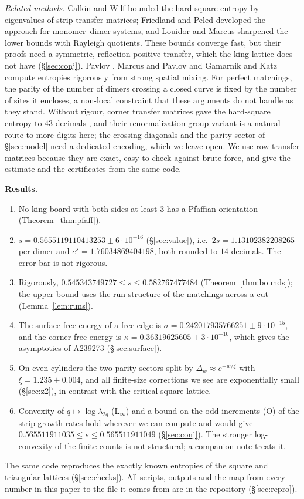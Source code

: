 \documentclass[11pt]{amsart}
\theoremstyle{definition}
\theoremstyle{remark}
\begin{document}
\emph{Related methods.} Calkin and Wilf \cite{calkinwilf1998} bounded the hard-square entropy by
eigenvalues of strip transfer matrices; Friedland and Peled \cite{friedlandpeled2005} developed
the approach for monomer--dimer systems, and Louidor and Marcus \cite{louidormarcus2010}
sharpened the lower bounds with Rayleigh quotients. These bounds converge fast, but their proofs
need a symmetric, reflection-positive transfer, which the king lattice does not have
(\S\ref{sec:conj}). Pavlov \cite{pavlov2012}, Marcus and Pavlov \cite{marcuspavlov2013} and
Gamarnik and Katz \cite{gamarnikkatz2009} compute entropies rigorously from strong spatial
mixing. For perfect matchings, the parity of the number of dimers crossing a closed curve is
fixed by the number of sites it encloses, a non-local constraint that these arguments do not
handle as they stand. Without rigour, corner transfer matrices gave the hard-square entropy to
$43$ decimals \cite{baxter1999}, and their renormalization-group variant
\cite{nishinookunishi1996} is a natural route to more digits here; the crossing diagonals and the
parity sector of \S\ref{sec:model} need a dedicated encoding, which we leave open. We use row
transfer matrices because they are exact, easy to check against brute force, and give the
estimate and the certificates from the same code.

\medskip\noindent\textbf{Results.}
\begin{enumerate}
\item No king board with both sides at least $3$ has a Pfaffian orientation
  (Theorem~\ref{thm:pfaff}).
\item $s = 0.5655119110413253 \pm 6\cdot10^{-16}$ (\S\ref{sec:value}), i.e.\ $2s = 1.13102382208265$
  per dimer and $e^{s} = 1.76034869404198$, both rounded to $14$ decimals. The error bar is not
  rigorous.
\item Rigorously, $0.545343749727 \le s \le 0.582767477484$ (Theorem~\ref{thm:bounds}); the upper bound
  uses the run structure of the matchings across a cut (Lemma~\ref{lem:runs}).
\item The surface free energy of a free edge is $\sigma = 0.242017935766251 \pm 9\cdot10^{-15}$, and
  the corner free energy is $\kappa = 0.36319625605 \pm 3\cdot10^{-10}$, which gives the
  asymptotics of A239273 (\S\ref{sec:surface}).
\item On even cylinders the two parity sectors split by $\Delta_w \approx e^{-w/\xi}$ with
  $\xi = 1.235 \pm 0.004$, and all finite-size corrections we see are exponentially small
  (\S\ref{sec:z2}), in contrast with the critical square lattice.
\item Convexity of $q \mapsto \log\lambda_{2q}$ (L$_\infty$) and a bound on the odd increments (O)
  of the strip growth rates hold wherever we can compute and would give
  $0.565511911035 \le s \le 0.565511911049$ (\S\ref{sec:conj}). The stronger log-convexity of the
  finite counts is not structural; a companion note \cite{rylko2026lnote} treats it.
\end{enumerate}
The same code reproduces the exactly known entropies of the square and triangular lattices
(\S\ref{sec:checks}). All scripts, outputs and the map from every number in this paper to the
file it comes from are in the repository (\S\ref{sec:repro}).
\end{document}
